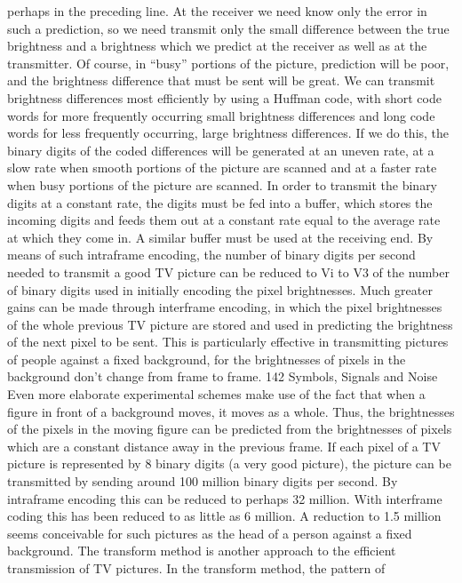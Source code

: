 {{{perhaps in the preceding line. At the receiver we need know only
the error in such a prediction, so we need transmit only the small
difference between the true brightness and a brightness which we
predict at the receiver as well as at the transmitter. Of course, in
“busy” portions of the picture, prediction will be poor, and the
brightness difference that must be sent will be great.
We can transmit brightness differences most efficiently by using
a Huffman code, with short code words for more frequently occurring
small brightness differences and long code words for less
frequently occurring, large brightness differences. If we do this,
the binary digits of the coded differences will be generated at an
uneven rate, at a slow rate when smooth portions of the picture are
scanned and at a faster rate when busy portions of the picture are
scanned. In order to transmit the binary digits at a constant rate,
the digits must be fed into a buffer, which stores the incoming
digits and feeds them out at a constant rate equal to the average
rate at which they come in. A similar buffer must be used at the
receiving end.
By means of such intraframe encoding, the number of binary
digits per second needed to transmit a good TV picture can be
reduced to Vi to V3 of the number of binary digits used in initially
encoding the pixel brightnesses.
Much greater gains can be made through interframe encoding, in
which the pixel brightnesses of the whole previous TV picture are
stored and used in predicting the brightness of the next pixel to
be sent. This is particularly effective in transmitting pictures of
people against a fixed background, for the brightnesses of pixels in
the background don’t change from frame to frame.
142
Symbols, Signals and Noise
Even more elaborate experimental schemes make use of the fact
that when a figure in front of a background moves, it moves as a
whole. Thus, the brightnesses of the pixels in the moving figure can
be predicted from the brightnesses of pixels which are a constant
distance away in the previous frame.
If each pixel of a TV picture is represented by 8 binary digits (a
very good picture), the picture can be transmitted by sending
around 100 million binary digits per second. By intraframe encoding
this can be reduced to perhaps 32 million. With interframe
coding this has been reduced to as little as 6 million. A reduction
to 1.5 million seems conceivable for such pictures as the head of a
person against a fixed background.
The transform method is another approach to the efficient transmission
of TV pictures. In the transform method, the pattern of
}}}
